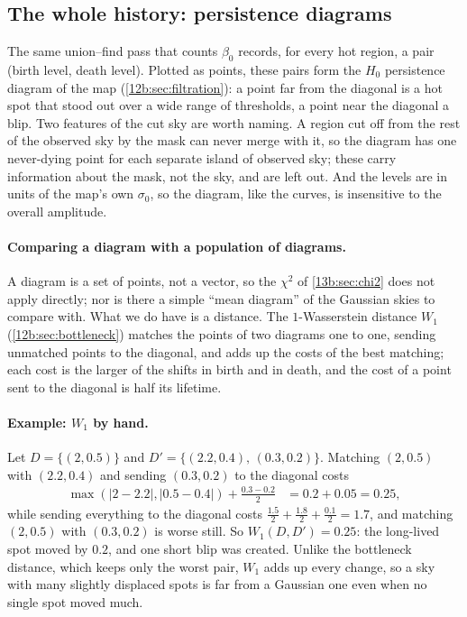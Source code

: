 \subsection{The whole history: persistence diagrams}
\label{13b:sec:persistence}

The same union--find pass that counts $\beta_0$ records, for every hot region, a pair (birth level, death level).
Plotted as points, these pairs form the $H_0$ persistence diagram of the map (\cref{12b:sec:filtration}): a point far
from the diagonal is a hot spot that stood out over a wide range of thresholds, a point near the diagonal a
blip. Two features of the cut sky are worth naming. A region cut off from the rest of the observed sky by the mask
can never merge with it, so the diagram has one never-dying point for each separate island of observed sky; these
carry information about the mask, not the sky, and are left out. And the levels are in units of the map's own
$\sigma_0$, so the diagram, like the curves, is insensitive to the overall amplitude.

\paragraph{Comparing a diagram with a population of diagrams.} A diagram is a set of points, not a vector, so the
$\chi^2$ of \cref{13b:sec:chi2} does not apply directly; nor is there a simple ``mean diagram'' of the Gaussian skies
to compare with. What we do have is a distance. The $1$-Wasserstein distance $W_1$ (\cref{12b:sec:bottleneck})
matches the points of two diagrams one to one, sending unmatched points to the diagonal, and adds up the costs of
the best matching; each cost is the larger of the shifts in birth and in death, and the cost of a point sent to
the diagonal is half its lifetime.

\paragraph{Example: $W_1$ by hand.} Let $D=\{(2,0.5)\}$ and $D'=\{(2.2,0.4),\,(0.3,0.2)\}$. Matching
$(2,0.5)$ with $(2.2,0.4)$ and sending $(0.3,0.2)$ to the diagonal costs
\begin{align*}
  \max(|2-2.2|,|0.5-0.4|)+\frac{0.3-0.2}{2}
  &= 0.2+0.05=0.25 ,
\end{align*}
while sending everything to the diagonal costs $\frac{1.5}{2}+\frac{1.8}{2}+\frac{0.1}{2}=1.7$, and matching $(2,0.5)$
with $(0.3,0.2)$ is worse still. So $W_1(D,D')=0.25$: the long-lived spot moved by $0.2$, and one short blip was
created. Unlike the bottleneck distance, which keeps only the worst pair, $W_1$ adds up every change, so a sky with
many slightly displaced spots is far from a Gaussian one even when no single spot moved much.

